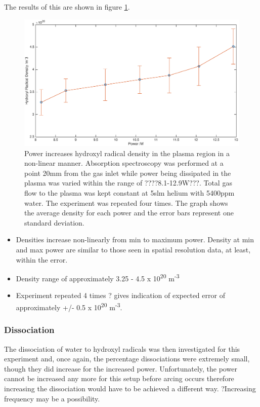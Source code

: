 \documentclass[11pt, oneside]{article}   	%
\begin{document}
The results of this are shown in figure \ref{fig:PowerVariation}.

\begin{figure}
    \centering
    \includegraphics[width=\textwidth]{Figures/PowerVariation.eps}
    \caption{Power increases hydroxyl radical density in the plasma region in a non-linear manner. Absorption spectroscopy was performed at a point 20mm from the gas inlet while power being dissipated in the plasma was varied within the range of ????8.1-12.9W???. Total gas flow to the plasma was kept constant at 5slm helium with 5400ppm water. The experiment was repeated four times. The graph shows the average density for each power and the error bars represent one standard deviation.}
    \label{fig:PowerVariation}
\end{figure}

\begin{itemize}
    \item Densities increase non-linearly from min to maximum power.  Density at min and max power are similar to those seen in spatial resolution data, at least, within the error.
    \item Density range of approximately 3.25 - 4.5 x 10\textsuperscript{20} m\textsuperscript{-3}
    \item Experiment repeated 4 times ? gives indication of expected error of approximately +/- 0.5 x 10\textsuperscript{20} m\textsuperscript{-3}.
\end{itemize}

\subsubsection{Dissociation}

The dissociation of water to hydroxyl radicals was then investigated for this experiment and, once again, the percentage dissociations were extremely small, though they did increase for the increased power. 
Unfortunately, the power cannot be increased any more for this setup before arcing occurs therefore increasing the dissociation would have to be achieved a different way. ?Increasing frequency may be a possibility.
\end{document}
